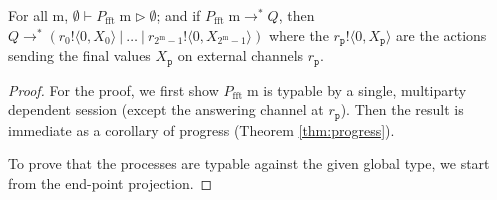 \documentclass{LMCS}
\newcommand{\ptilde}[1]{{\ensuremath{#1}}}
\newcommand{\pp}{\ensuremath{\at{\p}}}
\newcommand{\participant}[1]{\ensuremath{\mathtt{#1}}}
\newcommand{\p}{\ensuremath{\participant{p}}}
\newcommand{\pc}{\Par}
\newcommand{\X}{\ensuremath{X}}
\newcommand{\at}[1]{\ensuremath{\ptilde{#1}}}
\newcommand{\Par}{\ensuremath{\ |\ }}
\newcommand{\APP}{\;}
\newcommand{\m}{\ensuremath{\mathrm{m}}}
\newcommand{\proves}{\vdash}                        \newcommand{\judg}{{J}}
\newcommand{\Poutend}[3]{\ensuremath{#1!\langle #2,#3\rangle}}
\begin{document}
\begin{thm}
\label{theorem:fft}
For all $\m$, $\emptyset \proves P_{\text{fft}} \APP \m\rhd \emptyset$;  
and if $P_{\text{fft}} \APP  \m \longrightarrow^\ast Q$, then $Q\longrightarrow^\ast
(\Poutend{r_0}{0}{\X_0}\pc\ldots\pc\Poutend{r_{2^\m-1}}{0}{\X_{2^\m-1}})$
where the $\Poutend{r_\pp}{0}{\X_\pp}$ are the actions sending the
final values $\X_\pp$ on external channels $r_\pp$. 
\end{thm}
\begin{proof}
For the proof, we first show 
$P_{\text{fft}} \APP  \m$ 
is typable by a single, multiparty dependent session
(except the answering channel at $r_\pp$).  
Then the result is immediate as a corollary
of progress (Theorem \ref{thm:progress}). 

To prove that 
the processes
are typable against the given global type,  
we start from the end-point projection. 


\end{proof}
\end{document}
